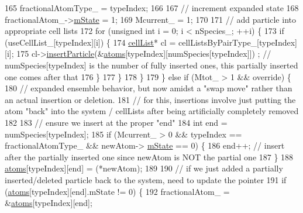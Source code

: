 \begin{DoxyCode}
165                     fractionalAtomType\_ = typeIndex;
166 
167                     \textcolor{comment}{// increment expanded state}
168                     fractionalAtom\_->\hyperlink{classatom_a3cb00c0c5b7533657e05af6ff4a42740}{mState} = 1;
169                     Mcurrent\_ = 1;
170 
171                     \textcolor{comment}{// add particle into appropriate cell lists}
172                     \textcolor{keywordflow}{for} (\textcolor{keywordtype}{unsigned} \textcolor{keywordtype}{int} i = 0; i < nSpecies\_; ++i) \{
173                         \textcolor{keywordflow}{if} (useCellList\_[typeIndex][i]) \{
174                             \hyperlink{classcell_list}{cellList}* cl = cellListsByPairType\_[typeIndex][i];
175                             cl->\hyperlink{classcell_list_a56c0012eed483e47248f9065bfc70fce}{insertParticle}(&\hyperlink{classsim_system_a90421b19082f7fb8fc23b7264b1161e4}{atoms}[typeIndex][numSpecies[typeIndex]])
      ; \textcolor{comment}{// numSpecies[typeIndex] is the number of fully inserted ones, this partially inserted one comes after
       that}
176                         \}
177                     \}
178                 \}
179             \} \textcolor{keywordflow}{else} \textcolor{keywordflow}{if} (Mtot\_ > 1 && \textcolor{keyword}{override}) \{
180                 \textcolor{comment}{// expanded ensemble behavior, but now amidst a "swap move" rather than an actual insertion
       or deletion.}
181                 \textcolor{comment}{// for this, insertions involve just putting the atom "back" into the system / cellLists
       after being artificially completely removed}
182 
183                 \textcolor{comment}{// ensure we insert at the proper "end"}
184                 \textcolor{keywordtype}{int} end = numSpecies[typeIndex];
185                 \textcolor{keywordflow}{if} (Mcurrent\_ > 0 && typeIndex == fractionalAtomType\_ && newAtom->
      \hyperlink{classatom_a3cb00c0c5b7533657e05af6ff4a42740}{mState} == 0) \{
186                     end++; \textcolor{comment}{// insert after the partially inserted one since newAtom is NOT the partial one}
187                 \}
188                 \hyperlink{classsim_system_a90421b19082f7fb8fc23b7264b1161e4}{atoms}[typeIndex][end] = (*newAtom);
189 
190                 \textcolor{comment}{// if we just added a partially inserted/deleted particle back to the system, need to
       update the pointer}
191                 \textcolor{keywordflow}{if} (\hyperlink{classsim_system_a90421b19082f7fb8fc23b7264b1161e4}{atoms}[typeIndex][end].mState != 0) \{
192                     fractionalAtom\_ = &\hyperlink{classsim_system_a90421b19082f7fb8fc23b7264b1161e4}{atoms}[typeIndex][end];

\end{DoxyCode}
